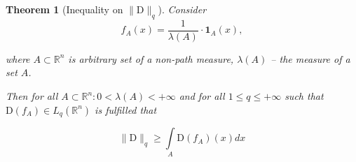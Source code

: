 \documentclass{article}
\newtheorem{theorem}{Theorem}
\begin{document}
    
    \begin{theorem}[Inequality on $\|\text{D}\|_q$] \label{ineq_q}
        Consider 
        \begin{equation}\label{f_R}
            f_A(x) = \dfrac{1}{\lambda(A)} \cdot \textbf{1}_{A}(x),
        \end{equation}

        where $A \subset \mathbb{R}^n$ is arbitrary set of a non-path measure, $\lambda(A)$ -- the measure of a set $A$.

        Then for all $A \subset \mathbb{R}^n :  0 < \lambda(A) < +\infty$ and for all $1 \leq q \leq +\infty$ such that $\text{D}(f_A) \in L_q(\mathbb{R}^n)$ is fulfilled that  

        \begin{equation}\label{int_f_R}
            \|\text{D}\|_q \geq \int\limits_{A} \text{D}(f_A)(x)dx
        \end{equation}
    \end{theorem}
    
\end{document}
